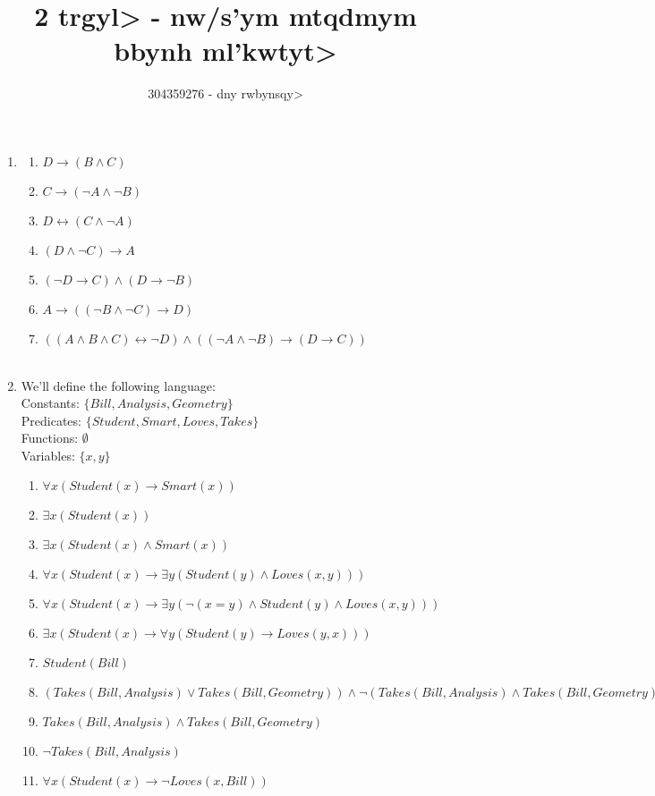 \documentclass{article}
\title{2 \<trgyl> - \<nw/s'ym mtqdmym bbynh ml'kwtyt>}
\author{304359276 - \<dny rwbynsqy>}
\date{}
\newcommand{\then}{\longrightarrow}
\renewcommand{\iff}{\longleftrightarrow}
\begin{document}
\maketitle

\begin{enumerate}
	\item { }
		\begin{enumerate}
			\item $D \then (B \land C)$
			\item $C \then (\lnot A \land \lnot B)$
			\item $D \iff (C \land \lnot A)$
			\item $(D \land \lnot C) \then A$
			\item $(\lnot D \then C) \land (D \then \lnot B)$
			\item $A \then ((\lnot B \land \lnot C) \then D)$
			\item $((A \land B \land C) \iff \lnot D) \land ((\lnot A \land \lnot B) \then (D \then C))$\\\\
		\end{enumerate}


	\item We'll define the following language:\\
			Constants: $\{Bill, Analysis, Geometry\}$\\
			Predicates: $\{Student, Smart, Loves, Takes\}$\\
			Functions: $\emptyset$\\
			Variables: $\{x,y\}$
	\begin{enumerate}
		\item $\forall x (Student(x) \then Smart(x))$
		\item $\exists x (Student(x))$
		\item $\exists x (Student(x) \land Smart(x))$
		\item $\forall x (Student(x) \then  \exists y (Student(y) \land Loves(x,y)))$
		\item $\forall x (Student(x) \then \exists y (\lnot(x=y) \land Student(y) \land Loves(x,y)))$
		\item $\exists x (Student(x) \then \forall y (Student(y) \then Loves(y,x)))$
		\item $Student(Bill)$
		\item $(Takes(Bill, Analysis) \lor Takes(Bill, Geometry)) \land \lnot (Takes(Bill, Analysis) \land Takes(Bill, Geometry))$
		\item $Takes(Bill, Analysis) \land Takes(Bill, Geometry)$
		\item $\lnot Takes(Bill, Analysis)$
		\item $\forall x (Student(x) \then \lnot Loves(x, Bill))$\\
		\end{enumerate}
                \newpage



\end{enumerate}
\end{document}
